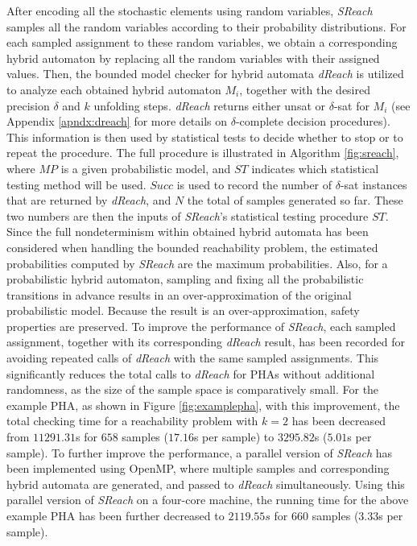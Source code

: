 After encoding all the stochastic elements using random variables, {\it SReach} samples all the random variables according to their probability distributions. For each sampled assignment to these random variables, we obtain a corresponding hybrid automaton by replacing all the random variables with their assigned values. Then, the bounded model checker for hybrid automata {\it dReach} \cite{gaodelta} is utilized to analyze each obtained hybrid automaton $M_i$, together with the desired precision $\delta$ and $k$ unfolding steps. {\it dReach} returns either unsat or $\delta$-sat for $M_i$ (see Appendix \ref{apndx:dreach} for more details on $\delta$-complete decision procedures). This information
is then used by statistical tests to decide whether to stop or to repeat the procedure. The full procedure is illustrated in Algorithm \ref{fig:sreach}, where $MP$ is a given probabilistic model, and $ST$ indicates which statistical testing method will be used. $Succ$ is used to record the number of $\delta$-sat instances that are returned by {\it dReach}, and $N$ the total of samples generated so far. These two numbers are then the inputs of {\it SReach}'s statistical testing procedure $ST$. Since the full nondeterminism within obtained hybrid automata has been considered when handling the bounded reachability problem, the estimated probabilities computed by {\it SReach} are the maximum probabilities. Also, for a probabilistic hybrid automaton, sampling and fixing all the probabilistic transitions in advance results in an over-approximation of the original probabilistic model. Because the result is an over-approximation, safety properties are preserved. To improve the performance of {\it SReach}, each sampled assignment, together with its corresponding {\it dReach} result, has been recorded for avoiding repeated calls of {\it dReach} with the same sampled assignments. This significantly reduces the total calls to {\it dReach} for PHAs without additional randomness, as the size of the sample space is comparatively small. For the example PHA, as shown in Figure \ref{fig:examplepha}, with this improvement, the total checking time for a reachability problem with $k=2$ has been decreased from $11291.31$s for $658$ samples ($17.16$s per sample) to $3295.82$s ($5.01$s per sample). To further improve the performance, a parallel version of {\it SReach} has been implemented using OpenMP, where multiple samples and corresponding hybrid automata are generated, and passed to {\it dReach} simultaneously. Using this parallel version of {\it SReach} on a four-core machine, the running time for the above example PHA has been further decreased to $2119.55s$ for $660$ samples ($3.33$s per sample). 
